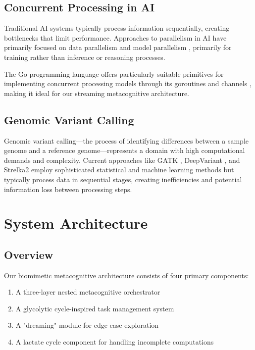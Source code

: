 \documentclass[11pt,a4paper,twocolumn]{article}
\begin{document}
\subsection{Concurrent Processing in AI}
Traditional AI systems typically process information sequentially, creating bottlenecks that limit performance. Approaches to parallelism in AI have primarily focused on data parallelism and model parallelism \cite{dean2012large}, primarily for training rather than inference or reasoning processes.

The Go programming language offers particularly suitable primitives for implementing concurrent processing models through its goroutines and channels \cite{donovan2015go}, making it ideal for our streaming metacognitive architecture.

\subsection{Genomic Variant Calling}
Genomic variant calling—the process of identifying differences between a sample genome and a reference genome—represents a domain with high computational demands and complexity. Current approaches like GATK \cite{mckenna2010genome}, DeepVariant \cite{poplin2018universal}, and Strelka2 \cite{kim2018strelka2} employ sophisticated statistical and machine learning methods but typically process data in sequential stages, creating inefficiencies and potential information loss between processing steps.

\section{System Architecture}

\subsection{Overview}
Our biomimetic metacognitive architecture consists of four primary components:

\begin{enumerate}
    \item A three-layer nested metacognitive orchestrator
    \item A glycolytic cycle-inspired task management system
    \item A "dreaming" module for edge case exploration
    \item A lactate cycle component for handling incomplete computations
\end{enumerate}
\end{document}
